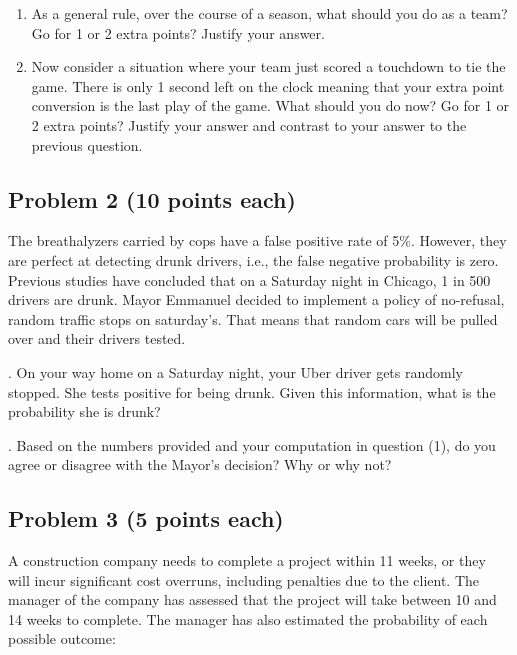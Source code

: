 \documentclass[12pt]{article}
\begin{document}
\vspace{0.5cm}
\begin{enumerate}
\item As a general rule, over the course of a season, what should you do as a team? Go for 1 or 2 extra points? Justify your answer.

\vspace{5cm}
\item Now consider a situation where  your team just scored a touchdown to tie the game. There is only 1 second left on the clock meaning that your extra point conversion is the last play of the game. What should you do now? Go for 1 or 2 extra points? Justify your answer and contrast to your answer to the previous question.
\end{enumerate}


\newpage




\subsection*{Problem 2 (10 points each)}

The breathalyzers carried  by cops have a false positive rate of 5\%. However, they are perfect at detecting drunk drivers, i.e., the false negative probability is zero. Previous studies have concluded that on a Saturday night in Chicago, 1 in 500 drivers are drunk. Mayor Emmanuel decided to implement a policy of no-refusal, random traffic stops on saturday's. That means that random cars will be pulled over and their drivers tested. 

\vspace{0.5cm}
. On your way home on a Saturday night, your Uber driver gets randomly stopped. She tests positive for being drunk. Given this information, what is the probability she is drunk?

\vspace{7cm}

. Based on the numbers provided and your computation in question (1), do you agree or disagree with the Mayor's decision? Why or why not?


\newpage



\subsection*{Problem 3 (5 points each)}

A construction company needs to complete a project within 11 weeks, or they will incur significant cost overruns, including penalties due to the client. The manager of the company has assessed that the project will take between 10 and 14 weeks to complete. The manager has also estimated the probability of each possible outcome:
\end{document}
